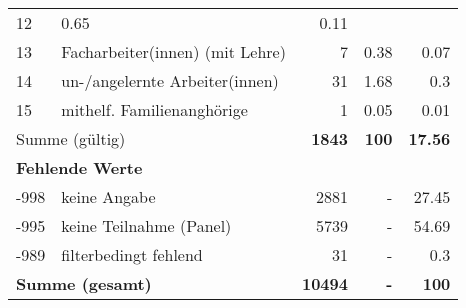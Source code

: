 \begin{longtable}{lXrrr}
       \num{12} &
       \num[round-mode=places,round-precision=2]{0.65} &
         \num[round-mode=places,round-precision=2]{0.11} \\

     13 &
     \multicolumn{1}{X}{ Facharbeiter(innen) (mit Lehre)   } &


       \num{7} &
       \num[round-mode=places,round-precision=2]{0.38} &
         \num[round-mode=places,round-precision=2]{0.07} \\

     14 &
     \multicolumn{1}{X}{ un-/angelernte Arbeiter(innen)   } &


       \num{31} &
       \num[round-mode=places,round-precision=2]{1.68} &
         \num[round-mode=places,round-precision=2]{0.3} \\

     15 &
     \multicolumn{1}{X}{ mithelf. Familienanghörige   } &


       \num{1} &
       \num[round-mode=places,round-precision=2]{0.05} &
         \num[round-mode=places,round-precision=2]{0.01} \\
     \midrule
     \multicolumn{2}{l}{Summe (gültig)} &
       \textbf{\num{1843}} &
     \textbf{\num{100}} &
       \textbf{\num[round-mode=places,round-precision=2]{17.56}} \\
     \multicolumn{5}{l}{\textbf{Fehlende Werte}}\\
       -998 &
       keine Angabe &
         \num{2881} &
        - &
         \num[round-mode=places,round-precision=2]{27.45} \\
       -995 &
       keine Teilnahme (Panel) &
         \num{5739} &
        - &
         \num[round-mode=places,round-precision=2]{54.69} \\
       -989 &
       filterbedingt fehlend &
         \num{31} &
        - &
         \num[round-mode=places,round-precision=2]{0.3} \\
     \midrule
     \multicolumn{2}{l}{\textbf{Summe (gesamt)}} &
          \textbf{\num{10494}} &
        \textbf{-} &
        \textbf{\num{100}} \\
     \bottomrule
     \end{longtable}
     
